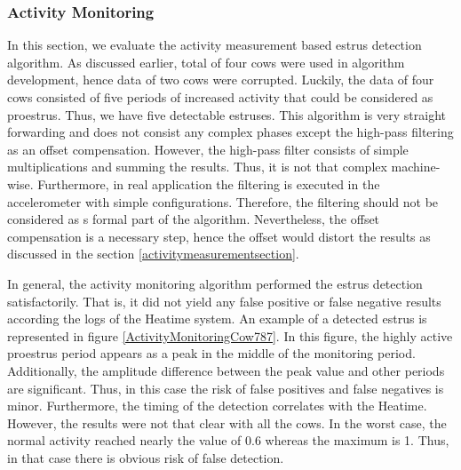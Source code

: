 \documentclass[english,12pt,a4paper,pdftex,elec,utf8]{aaltothesis}
\begin{document}
\subsubsection{Activity Monitoring} \label{activitymeasurementevaluation}

In this section, we evaluate the activity measurement based estrus detection algorithm. As discussed earlier, total of four cows were used in algorithm development, hence data of two cows were corrupted.  Luckily, the data of four cows consisted of five periods of increased activity that could be considered as proestrus. Thus, we have five detectable estruses. This algorithm is very straight forwarding and does not consist any complex phases except the high-pass filtering as an offset compensation. However, the high-pass filter consists of simple multiplications and summing the results. Thus, it is not that complex machine-wise. Furthermore, in real application the filtering is executed in the accelerometer with simple configurations. Therefore, the filtering should not be considered as s formal part of the algorithm. Nevertheless, the offset compensation is a necessary step, hence the offset would distort the results as discussed in the section \ref{activitymeasurementsection}.

In general, the activity monitoring algorithm performed the estrus detection satisfactorily. That is, it did not yield any false positive or false negative results according the logs of the Heatime system. An example of a detected estrus is represented in figure \ref{ActivityMonitoringCow787}. In this figure, the highly active proestrus period appears as a peak in the middle of the monitoring period. Additionally, the amplitude difference between the peak value and other periods are significant. Thus, in this case the risk of false positives and false negatives is minor. Furthermore, the timing of the detection correlates with the Heatime. However, the results were not that clear with all the cows. In the worst case, the normal activity reached nearly the value of 0.6 whereas the maximum is 1. Thus, in that case there is obvious risk of false detection. 
\end{document}
